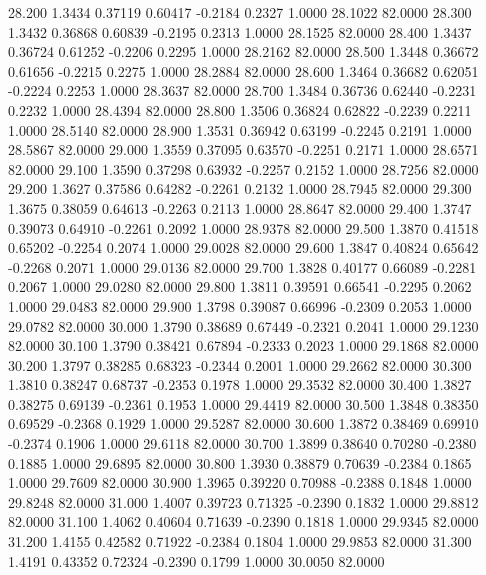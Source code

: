   28.200   1.3434   0.37119   0.60417  -0.2184   0.2327   1.0000  28.1022  82.0000
  28.300   1.3432   0.36868   0.60839  -0.2195   0.2313   1.0000  28.1525  82.0000
  28.400   1.3437   0.36724   0.61252  -0.2206   0.2295   1.0000  28.2162  82.0000
  28.500   1.3448   0.36672   0.61656  -0.2215   0.2275   1.0000  28.2884  82.0000
  28.600   1.3464   0.36682   0.62051  -0.2224   0.2253   1.0000  28.3637  82.0000
  28.700   1.3484   0.36736   0.62440  -0.2231   0.2232   1.0000  28.4394  82.0000
  28.800   1.3506   0.36824   0.62822  -0.2239   0.2211   1.0000  28.5140  82.0000
  28.900   1.3531   0.36942   0.63199  -0.2245   0.2191   1.0000  28.5867  82.0000
  29.000   1.3559   0.37095   0.63570  -0.2251   0.2171   1.0000  28.6571  82.0000
  29.100   1.3590   0.37298   0.63932  -0.2257   0.2152   1.0000  28.7256  82.0000
  29.200   1.3627   0.37586   0.64282  -0.2261   0.2132   1.0000  28.7945  82.0000
  29.300   1.3675   0.38059   0.64613  -0.2263   0.2113   1.0000  28.8647  82.0000
  29.400   1.3747   0.39073   0.64910  -0.2261   0.2092   1.0000  28.9378  82.0000
  29.500   1.3870   0.41518   0.65202  -0.2254   0.2074   1.0000  29.0028  82.0000
  29.600   1.3847   0.40824   0.65642  -0.2268   0.2071   1.0000  29.0136  82.0000
  29.700   1.3828   0.40177   0.66089  -0.2281   0.2067   1.0000  29.0280  82.0000
  29.800   1.3811   0.39591   0.66541  -0.2295   0.2062   1.0000  29.0483  82.0000
  29.900   1.3798   0.39087   0.66996  -0.2309   0.2053   1.0000  29.0782  82.0000
  30.000   1.3790   0.38689   0.67449  -0.2321   0.2041   1.0000  29.1230  82.0000
  30.100   1.3790   0.38421   0.67894  -0.2333   0.2023   1.0000  29.1868  82.0000
  30.200   1.3797   0.38285   0.68323  -0.2344   0.2001   1.0000  29.2662  82.0000
  30.300   1.3810   0.38247   0.68737  -0.2353   0.1978   1.0000  29.3532  82.0000
  30.400   1.3827   0.38275   0.69139  -0.2361   0.1953   1.0000  29.4419  82.0000
  30.500   1.3848   0.38350   0.69529  -0.2368   0.1929   1.0000  29.5287  82.0000
  30.600   1.3872   0.38469   0.69910  -0.2374   0.1906   1.0000  29.6118  82.0000
  30.700   1.3899   0.38640   0.70280  -0.2380   0.1885   1.0000  29.6895  82.0000
  30.800   1.3930   0.38879   0.70639  -0.2384   0.1865   1.0000  29.7609  82.0000
  30.900   1.3965   0.39220   0.70988  -0.2388   0.1848   1.0000  29.8248  82.0000
  31.000   1.4007   0.39723   0.71325  -0.2390   0.1832   1.0000  29.8812  82.0000
  31.100   1.4062   0.40604   0.71639  -0.2390   0.1818   1.0000  29.9345  82.0000
  31.200   1.4155   0.42582   0.71922  -0.2384   0.1804   1.0000  29.9853  82.0000
  31.300   1.4191   0.43352   0.72324  -0.2390   0.1799   1.0000  30.0050  82.0000
